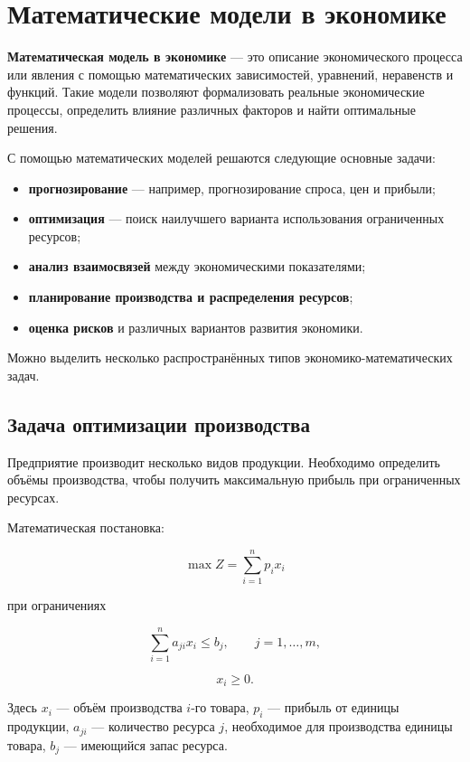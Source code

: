 \section{Математические модели в экономике}
\label{sec:models-in-economics}

\textbf{Математическая модель в экономике} --- это описание экономического 
процесса или явления с помощью математических зависимостей, уравнений, 
неравенств и функций. Такие модели позволяют формализовать реальные 
экономические процессы, определить влияние различных факторов и найти 
оптимальные решения.

С помощью математических моделей решаются следующие основные задачи:

\begin{itemize}
	\item \textbf{прогнозирование} --- например, прогнозирование спроса, цен и прибыли;
	\item \textbf{оптимизация} --- поиск наилучшего варианта использования ограниченных ресурсов;
	\item \textbf{анализ взаимосвязей} между экономическими показателями;
	\item \textbf{планирование производства и распределения ресурсов};
	\item \textbf{оценка рисков} и различных вариантов развития экономики.
\end{itemize}

Можно выделить несколько распространённых типов экономико-математических задач.

\subsection{Задача оптимизации производства}

Предприятие производит несколько видов продукции. Необходимо определить 
объёмы производства, чтобы получить максимальную прибыль при ограниченных 
ресурсах.

Математическая постановка:

\[
\max Z = \sum_{i=1}^{n} p_i x_i
\]

при ограничениях

\[
\sum_{i=1}^{n} a_{ji}x_i \leq b_j,
\qquad j=1,\ldots,m,
\]

\[
x_i \geq 0.
\]

Здесь $x_i$ --- объём производства $i$-го товара, $p_i$ --- прибыль от 
единицы продукции, $a_{ji}$ --- количество ресурса $j$, необходимое для 
производства единицы товара, $b_j$ --- имеющийся запас ресурса.

